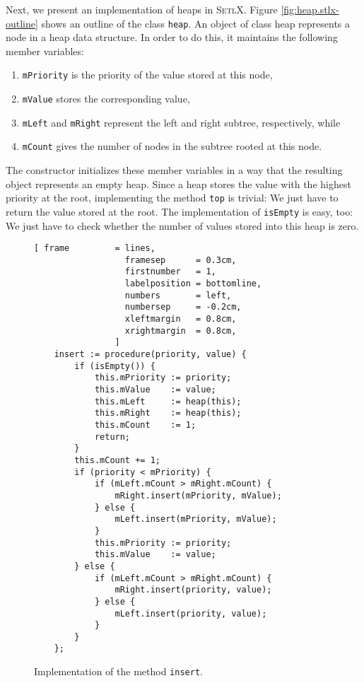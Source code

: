 \noindent
Next, we present an implementation of heaps in \textsc{SetlX}. 
Figure \ref{fig:heap.stlx-outline} shows an outline of the class \texttt{heap}.  An object of class
heap represents a node in a heap data structure. In order to do this, it maintains the following
member variables:
\begin{enumerate}
\item \texttt{mPriority} is the priority of the value stored at this node,
\item \texttt{mValue}    stores the corresponding value,
\item \texttt{mLeft} and \texttt{mRight} represent the left and right subtree, respectively, while
\item \texttt{mCount}    gives the number of nodes in the subtree rooted at this node.
\end{enumerate}
The constructor initializes these member variables in a way that the resulting object represents an
empty heap.  Since a heap stores the value with the highest priority at the root, implementing the
method \texttt{top} is trivial: We just have to return the value stored at the root.
The implementation of \texttt{isEmpty} is easy, too: We just have to check whether the number of
values stored into this heap is zero.
\begin{figure}[!ht]
\centering
\begin{Verbatim}[ frame         = lines, 
                  framesep      = 0.3cm, 
                  firstnumber   = 1,
                  labelposition = bottomline,
                  numbers       = left,
                  numbersep     = -0.2cm,
                  xleftmargin   = 0.8cm,
                  xrightmargin  = 0.8cm,
                ]
    insert := procedure(priority, value) {
        if (isEmpty()) {
            this.mPriority := priority;
            this.mValue    := value;
            this.mLeft     := heap(this);
            this.mRight    := heap(this);
            this.mCount    := 1;
            return;
        }
        this.mCount += 1;
        if (priority < mPriority) {                         
            if (mLeft.mCount > mRight.mCount) {
                mRight.insert(mPriority, mValue);
            } else {
                mLeft.insert(mPriority, mValue);
            }
            this.mPriority := priority;
            this.mValue    := value;
        } else {
            if (mLeft.mCount > mRight.mCount) { 
                mRight.insert(priority, value);
            } else {
                mLeft.insert(priority, value);
            }
        }
    };
\end{Verbatim}
\vspace*{-0.3cm}
\caption{Implementation of the method \texttt{insert}.}
\label{fig:heap.stlx-insert}
\end{figure}

